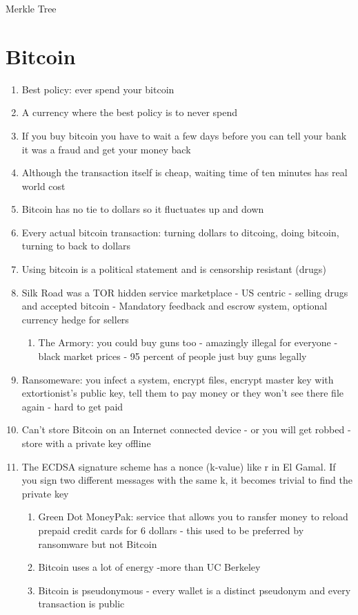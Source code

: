 \documentclass{article}
\begin{document}
Merkle Tree
\section{Bitcoin}
\begin{enumerate}
\item Best policy: ever spend your bitcoin
\item A currency where the best policy is to never spend
\item If you buy bitcoin you have to wait a few days before you can tell your bank it was a fraud and get your money back
\item Although the transaction itself is cheap, waiting time of ten minutes has real world cost
\item Bitcoin has no tie to dollars so it fluctuates up and down
\item Every actual bitcoin transaction: turning dollars to ditcoing, doing bitcoin, turning to back to dollars
\item Using bitcoin is a political statement and is censorship resistant (drugs)
\item Silk Road was a TOR hidden service marketplace - US centric - selling drugs and accepted bitcoin - Mandatory feedback and escrow system, optional currency hedge for sellers
\begin{enumerate}
\item The Armory: you could buy guns too - amazingly illegal for everyone - black market prices - 95 percent of people just buy guns legally
\end{enumerate}
\item Ransomeware: you infect a system, encrypt files, encrypt master key with extortionist's public key, tell them to pay money or they won't see there file again - hard to get paid
\item Can't store Bitcoin on an Internet connected device - or you will get robbed - store with a private key offline
\item The ECDSA signature scheme has a nonce (k-value) like r in El Gamal. If you sign two different messages with the same k, it becomes trivial to find the private key
\begin{enumerate}
\item Green Dot MoneyPak: service that allows you to ransfer money to reload prepaid credit cards for 6 dollars - this used to be preferred by ransomware but not Bitcoin
\item Bitcoin uses a lot of energy -more than UC Berkeley
\item Bitcoin is pseudonymous - every wallet is a distinct pseudonym and every transaction is public

\end{enumerate}
\end{enumerate}
\end{document}
